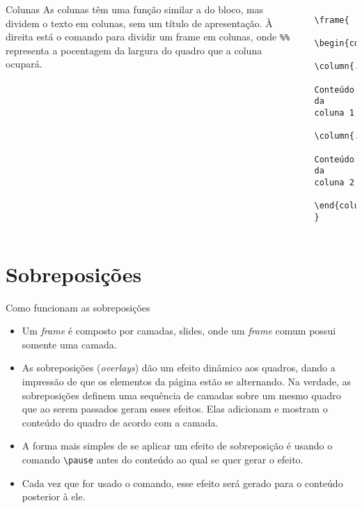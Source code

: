 \documentclass{beamer}
\begin{document}
\begin{frame}[fragile]
    \begin{columns} 
    \begin{block}{Colunas} 
    As colunas t\^em uma função similar a do bloco, mas dividem o texto em colunas, sem um título de apresentação. \`A direita est\'a o comando para dividir um frame em colunas, onde \verb|%%| representa a pocentagem da largura do quadro que a coluna ocupará.     
    \end{block}
    \pause
    
     \begin{verbatim}
         \frame{ 
         \begin{columns} 
         \column{.%%\textwidth} 
         Conteúdo da coluna 1 
         \column{.%%\textwidth} 
         Conteúdo da coluna 2  
         \end{columns} }
     \end{verbatim}
    \end{columns} 
\end{frame}

\section{Sobreposi\c c\~oes}

\begin{frame}[fragile]
    \begin{block}{Como funcionam as sobreposi\c c\~oes}
       
        \begin{itemize}
        \justifying
            \item  <1-> Um \textit{frame} é composto por camadas, slides, onde um \textit{frame} comum possui somente uma camada.

            \item <2-> As sobreposições (\textit{overlays}) dão um efeito dinâmico aos quadros, dando a impressão de que os elementos da página estão se alternando. Na verdade, as sobreposições definem uma sequência de camadas sobre um mesmo quadro que ao serem passados geram esses efeitos. Elas adicionam e mostram o conteúdo do quadro de acordo com a camada.

            \item  <3-> A forma mais simples de se aplicar um efeito de sobreposição é usando o comando \verb|\pause| antes do conteúdo ao qual se quer gerar o efeito.

            \item <4-> Cada vez que for usado o comando, esse efeito será gerado para o conteúdo posterior à ele.
        \end{itemize}
          
    \end{block}
    
\end{frame}
\end{document}
